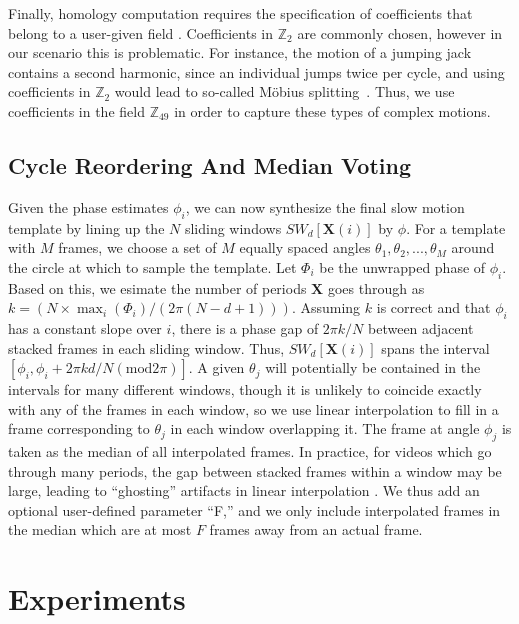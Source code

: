 \documentclass{article}
\newcommand{\mb}{\mathbf}
\begin{document}
Finally, homology computation requires the specification of coefficients that belong to a user-given field \cite{Hatcher,maria2014gudhi}. Coefficients in $\mathbb{Z}_2$ are commonly chosen, however in our scenario this is problematic. For instance, the motion of a jumping jack contains a second harmonic, since an individual jumps twice per cycle, and using coefficients in $\mathbb{Z}_2$ would lead to so-called M{\"o}bius splitting~\cite{traliemoebius}. Thus, we use coefficients in the field $\mathbb{Z}_{49}$ in order to capture these types of complex motions.

\subsection{Cycle Reordering And Median Voting}
\label{sec:cyclereordering}

Given the phase estimates $\phi_i$, we can now synthesize the final slow motion template by lining up the $N$ sliding windows $SW_{d}[\mb{X}(i)]$ by $\phi$.  For a template with $M$ frames, we choose a set of $M$ equally spaced angles $\theta_1, \theta_2, ..., \theta_M$ around the circle at which to sample the template.  Let $\Phi_i$ be the unwrapped phase of $\phi_i$.  Based on this, we esimate the number of periods $\mb{X}$ goes through as $k = (N \times \max_i(\Phi_i) / (2 \pi (N-d+1)))$.  Assuming $k$ is correct and that $\phi_i$ has a constant slope over $i$, there is a phase gap of $2 \pi k/N$ between adjacent stacked frames in each sliding window.  Thus, $SW_{d}[\mb{X}(i)]$ spans the interval $[\phi_i, \phi_i + 2\pi k d/N (\text{mod} 2 \pi)]$.  A given $\theta_j$ will potentially be contained in the intervals for many different windows, though it is unlikely to coincide exactly with any of the frames in each window, so we use linear interpolation to fill in a frame corresponding to $\theta_j$ in each window overlapping it.  The frame at angle $\phi_j$ is taken as the median of all interpolated frames.  In practice, for videos which go through many periods, the gap between stacked frames within a window may be large, leading to ``ghosting'' artifacts in linear interpolation \cite{meyer2015phase}.  We thus add an optional user-defined parameter ``F,'' and we only include interpolated frames in the median which are at most $F$ frames away from an actual frame.

\section{Experiments}
\label{sec:experiments}
\end{document}
